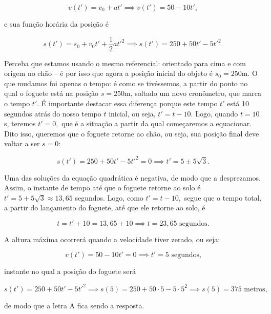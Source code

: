 \begin{exemplo}
\begin{enumerate}
  $$ v(t')=v_0+at' \implies \boxed{v(t')=50-10t',}$$

 \noindent e sua função horária da posição é

 $$s(t') = s_0 + v_0t'+ \dfrac{1}{2}at'^2 \implies \boxed{s(t')=250+50t'-5t'^2.}$$

 Perceba que estamos usando o mesmo referencial: orientado para cima e com origem no chão -- é por isso que agora a posição inicial do objeto é $s_0=250$m. O que mudamos foi apenas o tempo: é como se tivéssemos, a partir do ponto no qual o foguete está na posição $s=250$m, soltado um novo cronômetro, que marca o tempo $t'.$ É importante destacar essa diferença porque este tempo $t'$ está 10 segundos atrás do nosso tempo $t$ inicial, ou seja, $t'=t-10.$ Logo, quando $t=10$s, teremos $t'=0,$ que é a situação a partir da qual começaremos a equacionar. Dito isso, queremos que o foguete retorne ao chão, ou seja, sua posição final deve voltar a ser $s=0:$

 $$ s(t')=250+50t'-5t'^2=0 \implies \boxed{t'=5\pm5\sqrt3.}$$

 Uma das soluções da equação quadrática é negativa, de modo que a desprezamos. Assim, o instante de tempo até que o foguete retorne ao solo é $t'=5+5\sqrt3 \approx 13,65$ segundos. Logo, como $t'=t-10,$ segue que o tempo total, a partir do lançamento do foguete, até que ele retorne ao solo, é

 $$ t = t'+ 10 = 13,65 + 10 \implies \boxed{t=23,65 \text{ segundos.}} $$

 A altura máxima ocorrerá quando a velocidade tiver zerado, ou seja:

 $$ v(t')=50-10t' = 0 \implies \boxed{t'=5 \text{ segundos,}}$$

\noindent instante no qual a posição do foguete será

$$ s(t')=250+50t'-5t'^2 \implies s(5)=250+50 \cdot 5 -5 \cdot 5^2 \implies \boxed{ s(5)= 375 \text{ metros,}} $$

 \noindent de modo que a letra A fica sendo a resposta.
    
\end{enumerate}

  

\end{exemplo}

\vspace{0.3cm}





